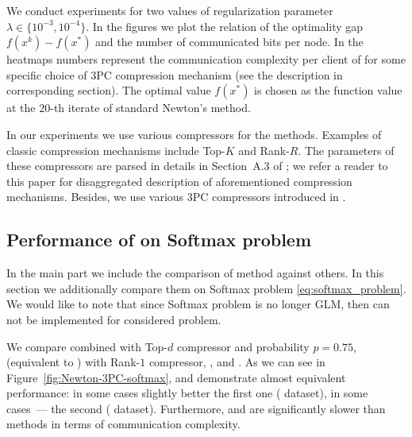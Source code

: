 \documentclass[11pt]{article}
\begin{document}
	We conduct experiments for two values of regularization parameter $\lambda\in \{10^{-3}, 10^{-4}\}$. In the figures we plot the relation of the optimality gap $f(x^k)-f(x^*)$ and the number of communicated bits per node. In the heatmaps numbers represent the communication complexity per client of  for some specific choice of 3PC compression mechanism (see the description in corresponding section). The optimal value $f(x^*)$ is chosen as the function value at the $20$-th iterate of standard Newton's method.   
	
	
	In our experiments we use various compressors for the methods. Examples of classic compression mechanisms include Top-$K$ and Rank-$R$. The parameters of these compressors are parsed in details in Section~A.3 of \citep{FedNL2021}; we refer a reader to this paper for disaggregated description of aforementioned compression mechanisms. Besides, we use various 3PC compressors introduced in \citep{richtarik3PC}.
	
	\subsection{Performance of  on Softmax problem}
	
	In the main part we include the comparison of  method against others. In this section we additionally compare them on Softmax problem \eqref{eq:softmax_problem}. We would like to note that since Softmax problem is no longer GLM, then  \citep{Islamov2021NewtonLearn} can not be implemented for considered problem. 
	
	We compare  combined with Top-$d$ compressor and probability $p=0.75$,  (equivalent to  \citep{FedNL2021}) with Rank-$1$ compressor,  \citep{DINGO}, and  \citep{IOSFabbro2022}. As we can see in Figure~\ref{fig:Newton-3PC-softmax},  and  demonstrate almost equivalent performance: in some cases slightly better the first one ( dataset), in some cases~--- the second ( dataset). Furthermore,  and  are significantly slower than  methods in terms of communication complexity.
	
\end{document}
